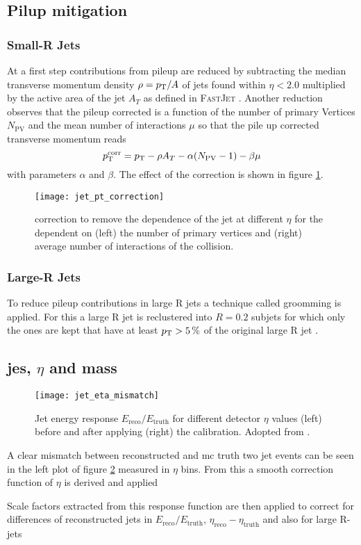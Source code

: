 \subsection{Pilup mitigation}
\subsubsection*{Small-R Jets}
At a first step contributions from pileup are reduced by subtracting the median transverse momentum density $\rho=p_{\text{T}} / A$ of jets found within $\eta<2.0$ multiplied by the active area of the jet $A_T$ as defined in \textsc{FastJet} \citep{cacciari2012fastjet}. Another reduction observes that the pileup corrected \pt is a function of the number of primary Vertices $N_\text{PV}$ and the mean number of interactions $\mu$ so that the pile up corrected transverse momentum reads 
\begin{equation}
p_{\text{T}}^\text{corr}=p_{\text{T}}-\rho A_T -\alpha(N_\text{PV}-1)-\beta\mu
\end{equation}
with parameters $\alpha$ and $\beta$. The effect of the correction is shown in figure \ref{fig:jet_pt_correction}.
\begin{figure}
  \centering
  \texttt{[image: jet\_pt\_correction]}
      \caption[]{\pt correction to remove the \pt dependence of the jet at different $\eta$ for the \pt dependent on (left) the number of primary vertices and (right) average number of interactions of the collision.}
  \label{fig:jet_pt_correction}    
\end{figure}
\subsubsection*{Large-R Jets}
To reduce pileup contributions in large R jets a technique called groomming is applied. For this a large R jet is reclustered into $R=0.2$ subjets for which only the ones are kept that have at least $p_{\text{T}}>\qty[]{5}{\percent}$ of the original large R jet \pt.

\subsection{\ac{jes}, $\eta$ and mass}
\begin{figure}
  \centering
  \texttt{[image: jet\_eta\_mismatch]}
      \caption[]{Jet energy response $E_\text{reco}/E_\text{truth}$ for different detector $\eta$ values (left) before and after applying (right) the calibration. Adopted from \citep{jet_eta_calib}.}
  \label{fig:jet_eta_mismatch}    
\end{figure}
A clear mismatch between reconstructed and \ac{mc} truth two jet events can be seen in the left plot of figure \ref{fig:jet_eta_mismatch} measured in $\eta$ bins. From this a smooth correction function of $\eta$ is derived and applied 


Scale factors extracted from this response function are then applied to correct for differences of reconstructed jets in $E_\text{reco}/E_\text{truth}$, $\eta_\text{reco}-\eta_\text{truth}$ and also for large R-jets 
